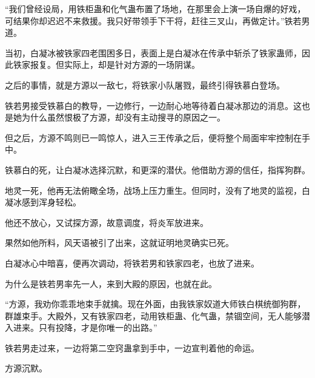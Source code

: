 \begin{this_body}
“我们曾经设局，用铁柜蛊和化气蛊布置了场地，在那里会上演一场自爆的好戏，可结果你却迟迟不来救援。我只好带领手下干将，赶往三叉山，再做定计。”铁若男道。

当初，白凝冰被铁家四老围困多日，表面上是白凝冰在传承中斩杀了铁家蛊师，因此铁家报复。但实际上，却是针对方源的一场阴谋。

之后的事情，就是方源以一敌七，将铁家小队屠戮，最终引得铁慕白登场。

铁若男接受铁慕白的教导，一边修行，一边耐心地等待着白凝冰那边的消息。这也是她为什么虽然恨极了方源，却没有主动搜寻的原因之一。

但之后，方源不鸣则已一鸣惊人，进入三王传承之后，便将整个局面牢牢控制在手中。

铁慕白的死，让白凝冰选择沉默，和更深的潜伏。他借助方源的信任，指挥狗群。

地灵一死，他再无法俯瞰全场，战场上压力重生。但同时，没有了地灵的监视，白凝冰感到浑身轻松。

他还不放心，又试探方源，故意调度，将炎军放进来。

果然如他所料，风天语被引了出来，这就证明地灵确实已死。

白凝冰心中暗喜，便再次调动，将铁若男和铁家四老，也放了进来。

为什么是铁若男率先一人，来到大殿的原因，也就在此。

“方源，我劝你乖乖地束手就擒。现在外面，由我铁家奴道大师铁白棋统御狗群，群雄束手。大殿外，又有铁家四老，动用铁柜蛊、化气蛊，禁锢空间，无人能够潜入进来。只有投降，才是你唯一的出路。”

铁若男走过来，一边将第二空窍蛊拿到手中，一边宣判着他的命运。

方源沉默。

\end{this_body}

